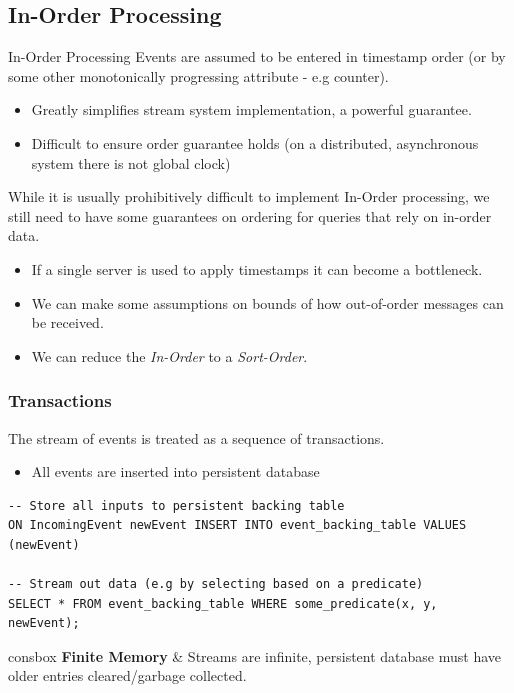 \subsection{In-Order Processing}
\begin{definitionbox}{In-Order Processing}
    Events are assumed to be entered in timestamp order (or by some other monotonically progressing attribute - e.g counter).
    \begin{itemize}
        \item Greatly simplifies stream system implementation, a powerful guarantee. 
        \item Difficult to ensure order guarantee holds (on a distributed, asynchronous system there is not global clock)
    \end{itemize}
\end{definitionbox}
While it is usually prohibitively difficult to implement In-Order processing, we still need to have some guarantees on ordering for queries that rely on in-order data.
\begin{itemize}
    \item If a single server is used to apply timestamps it can become a bottleneck.
    \item We can make some assumptions on bounds of how out-of-order messages can be received.
    \item We can reduce the \textit{In-Order} to a \textit{Sort-Order}.
\end{itemize}

\subsubsection{Transactions}
The stream of events is treated as a sequence of transactions.
\begin{itemize}
    \item All events are inserted into persistent database
\end{itemize}
\begin{verbatim}
-- Store all inputs to persistent backing table
ON IncomingEvent newEvent INSERT INTO event_backing_table VALUES (newEvent)

-- Stream out data (e.g by selecting based on a predicate)
SELECT * FROM event_backing_table WHERE some_predicate(x, y, newEvent);
\end{verbatim}
\begin{tabbox}{consbox}
    \textbf{Finite Memory} & Streams are infinite, persistent database must have older entries cleared/garbage collected. \\
\end{tabbox}

